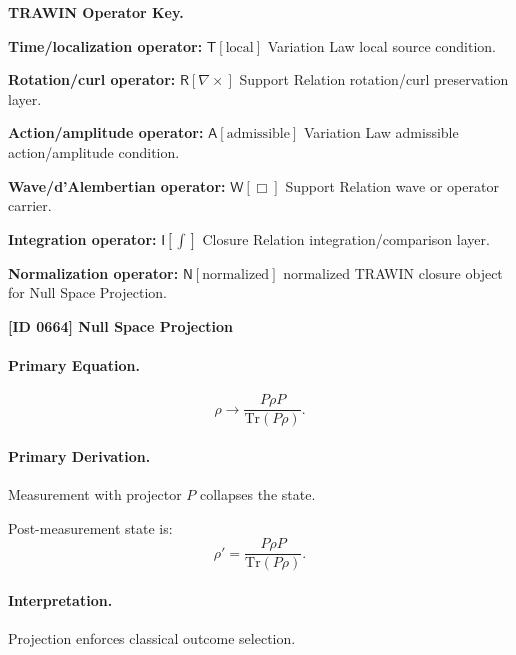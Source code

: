 \par\vspace{0.45\baselineskip}
\noindent\begin{minipage}[t]{\linewidth}
\begingroup
\small
\raggedright
\textbf{TRAWIN Operator Key.}\par
\noindent\textbf{Time/localization operator:} $\mathsf{T}\!\left[\mathrm{local}\right]$ Variation Law local source condition.\par
\noindent\textbf{Rotation/curl operator:} $\mathsf{R}\!\left[\nabla\times\right]$ Support Relation rotation/curl preservation layer.\par
\noindent\textbf{Action/amplitude operator:} $\mathsf{A}\!\left[\mathrm{admissible}\right]$ Variation Law admissible action/amplitude condition.\par
\noindent\textbf{Wave/d'Alembertian operator:} $\mathsf{W}\!\left[\Box\right]$ Support Relation wave or operator carrier.\par
\noindent\textbf{Integration operator:} $\mathsf{I}\!\left[\int\right]$ Closure Relation integration/comparison layer.\par
\noindent\textbf{Normalization operator:} $\mathsf{N}\!\left[\mathrm{normalized}\right]$ normalized TRAWIN closure object for Null Space Projection.\par
\endgroup
\end{minipage}

\clearpage
\noindent\textbf{[ID 0664] Null Space Projection}\par
\vspace{0.35em}
\paragraph{Primary Equation.}
\begin{equation}
\rho \rightarrow \frac{P \rho P}{\mathrm{Tr}(P\rho)}.
\end{equation}

\paragraph{Primary Derivation.}
Measurement with projector $P$ collapses the state.

Post-measurement state is:
\begin{equation}
\rho' = \frac{P \rho P}{\mathrm{Tr}(P\rho)}.
\end{equation}

\paragraph{Interpretation.}
Projection enforces classical outcome selection.

